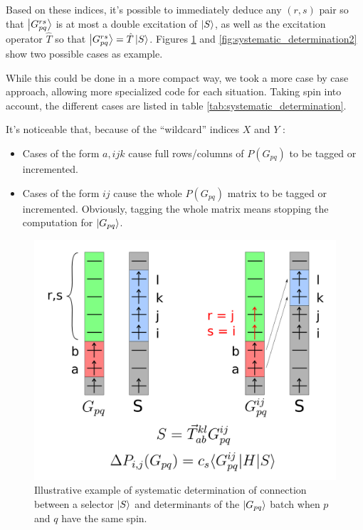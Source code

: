 \documentclass[./thesis.tex]{subfiles}
\begin{document}
Based on these indices, it's possible to immediately deduce any $(r,s)$ pair so that $\ket {G_{pq}^{rs}}$ is at most a double excitation of $\ket S$, as well as the excitation operator $\hat{T}$ so that $\ket {G_{pq}^{rs}}=\hat{T} \ket S$. Figures \ref{fig:systematic_determination} and \ref{fig:systematic_determination2} show two possible cases as example.

While this could be done in a more compact way, we took a more case by case approach, allowing more specialized code for each situation. Taking spin into account, the different cases are listed in table \ref{tab:systematic_determination}.


It's noticeable that, because of the ``wildcard'' indices $X$ and $Y$ :
\begin{itemize}

\item
Cases of the form $a,ijk$ cause full rows/columns of $P(G_{pq})$ to be tagged or incremented.
\item
Cases of the form $ij$ cause the whole $P(G_{pq})$ matrix to be tagged or incremented. Obviously, tagging the whole matrix means stopping the computation for $\ket {G_{pq}}$.
\end{itemize}

\begin{figure}[h!]
        \begin{center}
                \includegraphics[width=0.70\columnwidth]{figures/cipsi/systematic_determination}
                \caption{Illustrative example of systematic determination of connection between a selector $\ket S$ and determinants of the $\ket {G_{pq}}$ batch when $p$ and $q$ have the same spin.
}
                \label{fig:systematic_determination}
        \end{center}
        
\end{figure}
\end{document}
